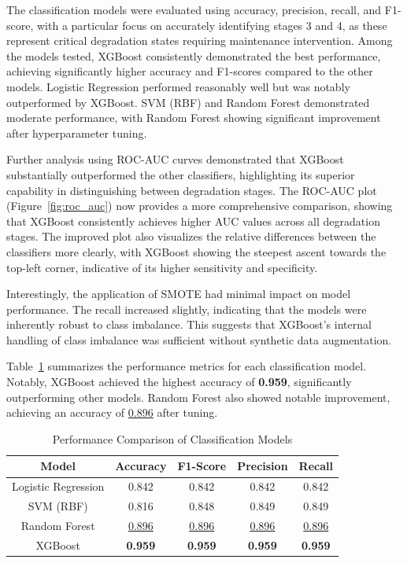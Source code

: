\documentclass[conference]{IEEEtran}
\begin{document}
The classification models were evaluated using accuracy, precision, recall, and F1-score, with a particular focus on accurately identifying stages 3 and 4, as these represent critical degradation states requiring maintenance intervention. Among the models tested, XGBoost consistently demonstrated the best performance, achieving significantly higher accuracy and F1-scores compared to the other models. Logistic Regression performed reasonably well but was notably outperformed by XGBoost. SVM (RBF) and Random Forest demonstrated moderate performance, with Random Forest showing significant improvement after hyperparameter tuning.

Further analysis using ROC-AUC curves demonstrated that XGBoost substantially outperformed the other classifiers, highlighting its superior capability in distinguishing between degradation stages. The ROC-AUC plot (Figure~\ref{fig:roc_auc}) now provides a more comprehensive comparison, showing that XGBoost consistently achieves higher AUC values across all degradation stages. The improved plot also visualizes the relative differences between the classifiers more clearly, with XGBoost showing the steepest ascent towards the top-left corner, indicative of its higher sensitivity and specificity.

Interestingly, the application of SMOTE had minimal impact on model performance. The recall increased slightly, indicating that the models were inherently robust to class imbalance. This suggests that XGBoost’s internal handling of class imbalance was sufficient without synthetic data augmentation.

Table~\ref{tab:model_comparison} summarizes the performance metrics for each classification model. Notably, XGBoost achieved the highest accuracy of \textbf{0.959}, significantly outperforming other models. Random Forest also showed notable improvement, achieving an accuracy of \underline{0.896} after tuning.

\begin{table}[h]
    \centering
    \caption{Performance Comparison of Classification Models}
    \begin{tabular}{|c|c|c|c|c|}
        \hline
        \textbf{Model} & \textbf{Accuracy} & \textbf{F1-Score} & \textbf{Precision} & \textbf{Recall} \\
        \hline
        Logistic Regression & 0.842 & 0.842 & 0.842 & 0.842 \\
        SVM (RBF) & 0.816 & 0.848 & 0.849 & 0.849 \\
        Random Forest & \underline{0.896} & \underline{0.896} & \underline{0.896} & \underline{0.896} \\
        XGBoost & \textbf{0.959} & \textbf{0.959} & \textbf{0.959} & \textbf{0.959} \\
        \hline
    \end{tabular}
    \label{tab:model_comparison}
\end{table}
\end{document}
